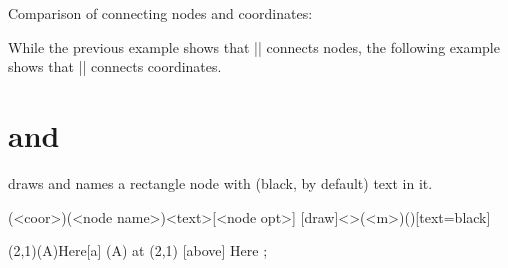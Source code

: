 \remark Comparison of connecting nodes and coordinates:


\begin{tzcode}{.3}
{}
\end{tzcode}

While the previous example shows that |\tzlines| connects nodes,
the following example shows that |\tzlines| connects coordinates.


\begin{tzcode}{.3}
{}
\end{tzcode}




\section{\protect\cmd{\tznodeframe} and \protect\cmd{\tznodeframe*}}
\label{s:tznodeframe}

\icmd{\tznodeframe} draws and  names a rectangle node with (black, by default) text in it.


\begin{tzdef}
\tznodeframe[<opt>](<coor>)(<node name>){<text>}[<node opt>]
 [draw]<>(<m>)(){}[text=black]
\end{tzdef}

\begin{tztikz}
\tznodeframe(2,1)(A){Here}[a]         %
   (A) at (2,1) [above] {Here} ;
\end{tztikz}


\begin{tzcode}{.3}
{}
\end{tzcode}

